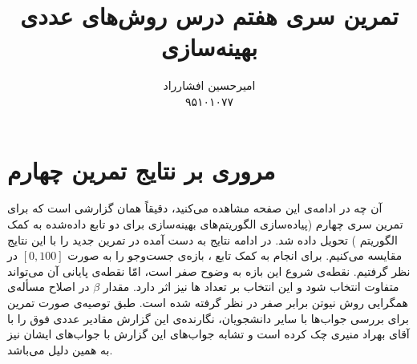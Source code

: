 \documentclass[a4paper]{article}
\title{تمرین سری هفتم درس روش‌های عددی بهینه‌سازی}
\author{امیرحسین افشارراد\\۹۵۱۰۱۰۷۷}
\theoremstyle{plain}
\theoremstyle{definition}
\theoremstyle{remark}
\begin{document}
	\maketitle
\section{مروری بر نتایج تمرین چهارم}
آن چه در ادامه‌ی این صفحه مشاهده می‌کنید، دقیقاً همان گزارشی است که برای تمرین سری چهارم (پیاده‌سازی الگوریتم‌های بهینه‌سازی برای دو تابع داده‌شده به کمک الگوریتم ) تحویل داده شد. در ادامه نتایج به دست آمده در تمرین جدید را با این نتایج مقایسه می‌کنیم.
\proposition
برای انجام  به کمک تابع ، بازه‌ی جست‌وجو را به صورت $[0,100]$ در نظر گرفتیم. نقطه‌ی شروع این بازه به وضوح صفر است، امّا نقطه‌ی پایانی آن می‌تواند متفاوت انتخاب شود و این انتخاب بر تعداد ها نیز اثر دارد.
\proposition 
مقدار $\beta$ در اصلاح مسأله‌ی همگرایی روش نیوتن برابر صفر در نظر گرفته شده است.
\proposition
طبق توصیه‌ی صورت تمرین برای بررسی جواب‌ها با سایر دانشجویان، نگارنده‌ی این گزارش مقادیر عددی فوق را با آقای بهراد منیری چک کرده است و تشابه جواب‌های این گزارش با جواب‌های ایشان نیز به همین دلیل می‌باشد.
\end{document}
